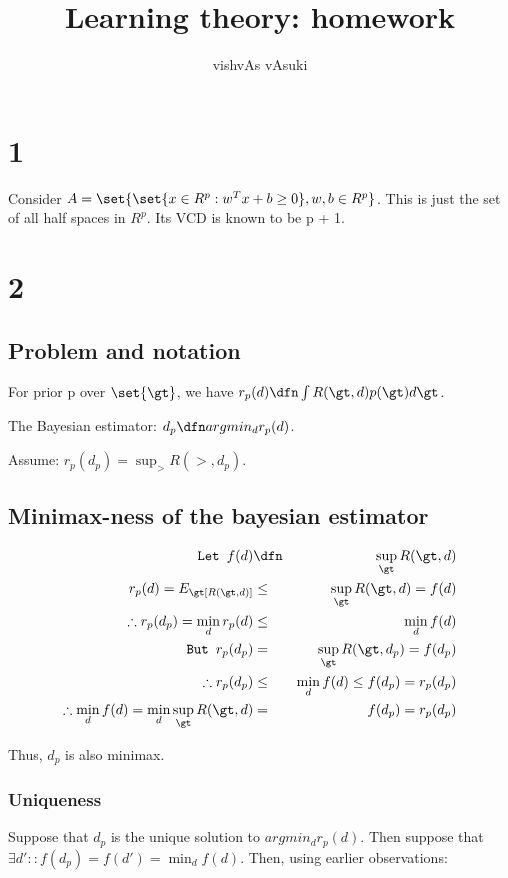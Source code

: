 \documentclass{article}
\title{Learning theory: homework}
\author{vishvAs vAsuki}
\begin{document}
\maketitle

\section{1}
Consider $A = \set{\set{x \in R^{p} : w^{T}x + b \geq 0}, w, b \in R^{p}}$. This is just the set of all half spaces in $R^{p}$. Its VCD is known to be p + 1.

\section{2}
\subsection{Problem and notation}
For prior p over $\set{\gt}$, we have $r_p(d) \dfn \int R(\gt, d)p(\gt)d \gt$.

The Bayesian estimator: $d_p \dfn argmin_d r_p(d)$.

Assume: $r_p(d_p) = \sup_\gt R(\gt, d_p)$.

\subsection{Minimax-ness of the bayesian estimator}
\begin{eqnarray*}
\texttt{Let } f(d) &\dfn& \sup_\gt R(\gt, d)\\
r_p(d) = E_\gt[R(\gt, d)] &\leq& \sup_\gt R(\gt, d) = f(d)\\
\therefore r_p(d_p) = \min_d r_p(d) &\leq& \min_d f(d)\\
\texttt{But } r_p(d_p) &=& \sup_\gt R(\gt, d_p) = f(d_p)\\
\therefore r_p(d_p) &\leq& \min_d f(d) \leq f(d_p) = r_p(d_p)\\
\therefore \min_d f(d) = \min_d \sup_\gt R(\gt, d) &=& f(d_p) = r_p(d_p)\\
\end{eqnarray*}

Thus, $d_p$ is also minimax.

\subsubsection{Uniqueness}
Suppose that $d_p$ is the unique solution to $argmin_d r_p(d)$. Then suppose that $\exists d':: f(d_p) = f(d') = \min_d f(d)$. Then, using earlier observations:
\end{document}
